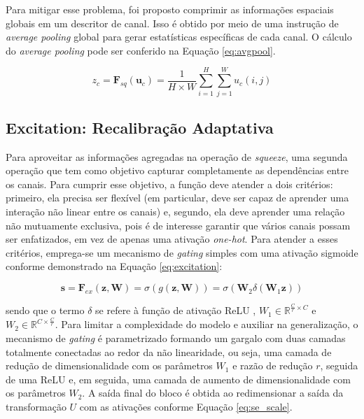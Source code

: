 Para mitigar esse problema, foi proposto comprimir as informações espaciais globais em um descritor de canal. Isso é obtido por meio de uma instrução de \textit{average pooling} global para gerar estatísticas específicas de cada canal. O cálculo do \textit{average pooling} pode ser conferido na Equação \ref{eq:avgpool}.

\begin{equation}
z_c = \mathbf{F}_{sq}(\mathbf{u}_c) = \frac{1}{H \times W} \sum_{i=1}^{H} \sum_{j=1}^{W} u_c(i, j)
\label{eq:avgpool}
\end{equation}

\subsection{Excitation: Recalibração Adaptativa}
\label{subsec:excitation}

Para aproveitar as informações agregadas na operação de \textit{squeeze}, uma segunda operação que tem como objetivo capturar completamente as dependências entre os canais. Para cumprir esse objetivo, a função deve atender a dois critérios: primeiro, ela precisa ser flexível (em particular, deve ser capaz de aprender uma interação não linear entre os canais) e, segundo, ela deve aprender uma relação não mutuamente exclusiva, pois é de interesse garantir que vários canais possam ser enfatizados, em vez de apenas uma ativação \textit{one-hot}. Para atender a esses critérios, emprega-se um mecanismo de \textit{gating} simples com uma ativação sigmoide conforme demonstrado na Equação \ref{eq:excitation}:

\begin{equation}
\mathbf{s} = \mathbf{F}_{ex}(\mathbf{z}, \mathbf{W}) = \sigma(g(\mathbf{z}, \mathbf{W})) = \sigma(\mathbf{W}_2 \delta(\mathbf{W}_1 \mathbf{z}))
\label{eq:excitation}
\end{equation}

\noindent sendo que o termo $\delta$ se refere à função de ativação ReLU \cite{nairRectifiedLinearUnits}, $W_1 \in \mathbb{R}^{\frac{C}{r} \times C}$ e $W_2 \in \mathbb{R}^{C \times \frac{C}{r}}$. Para limitar a complexidade do modelo e auxiliar na generalização, o mecanismo de \textit{gating} é parametrizado formando um gargalo com duas camadas totalmente conectadas ao redor da não linearidade, ou seja, uma camada de redução de dimensionalidade com os parâmetros $W_1$ e razão de redução $r$, seguida de uma ReLU e, em seguida, uma camada de aumento de dimensionalidade com os parâmetros $W_2$. A saída final do bloco é obtida ao redimensionar a saída da transformação $U$ com as ativações conforme Equação \ref{eq:se_scale}.


